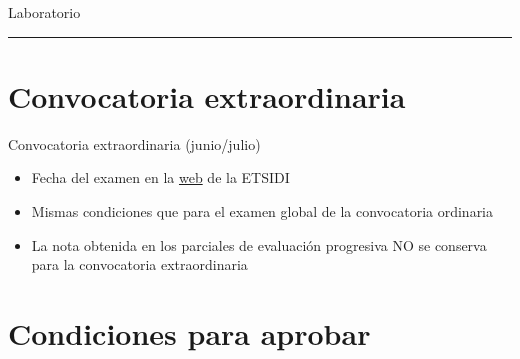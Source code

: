 \documentclass[aspectratio=169, usenames,svgnames,dvipsnames]{beamer}
\begin{document}
\begin{frame}{Laboratorio}
    \noindent\rule{\textwidth}{0.5pt}
    
    \vspace{-1mm}
    

\end{frame}


\section*{Convocatoria extraordinaria}

\begin{frame}{Convocatoria extraordinaria (junio/julio)}

    \vspace{-23mm}
    \begin{itemize}
        \item Fecha del examen en la \href{https://www.etsidi.upm.es/Estudiantes/AgendaAcademica/AAFechaExamenes}{web} de la ETSIDI
        \item \alert{Mismas condiciones} que para el examen global de la convocatoria ordinaria

        \vspace{6mm}

        \item La nota obtenida en los parciales de evaluación progresiva \alert{NO se conserva} para la convocatoria extraordinaria
    \end{itemize}

\end{frame}
        

\section*{Condiciones para aprobar}
\end{document}
